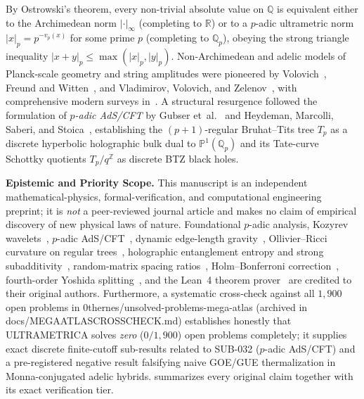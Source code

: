 \documentclass[11pt,a4paper]{article}
\numberwithin{equation}{section}
\theoremstyle{plain}
\theoremstyle{definition}
\theoremstyle{remark}
\newcommand{\Z}{\mathbb{Z}}
\newcommand{\Q}{\mathbb{Q}}
\newcommand{\R}{\mathbb{R}}
\newcommand{\Qp}{\mathbb{Q}_p}
\newcommand{\Tp}{T_p}
\newcommand{\code}[1]{{\ttfamily\footnotesize\def\_{\textunderscore\penalty0\hskip0pt}#1}}
\begin{document}
By Ostrowski's theorem, every non-trivial absolute value on $\Q$ is equivalent either to the Archimedean norm $|\cdot|_\infty$ (completing to $\R$) or to a $p$-adic ultrametric norm $|x|_p = p^{-v_p(x)}$ for some prime $p$ (completing to $\Qp$), obeying the strong triangle inequality $|x + y|_p \le \max(|x|_p, |y|_p)$. Non-Archimedean and adelic models of Planck-scale geometry and string amplitudes were pioneered by Volovich~\cite{Volovich1987}, Freund and Witten~\cite{FreundWitten1987}, and Vladimirov, Volovich, and Zelenov~\cite{Vladimirov1994}, with comprehensive modern surveys in~\cite{Dragovich2017}. A structural resurgence followed the formulation of \emph{$p$-adic AdS/CFT} by Gubser et~al.~\cite{Gubser2017,GubserEdge2017} and Heydeman, Marcolli, Saberi, and Stoica~\cite{Heydeman2018,Heydeman2021}, establishing the $(p+1)$-regular Bruhat--Tits tree $\Tp$ as a discrete hyperbolic holographic bulk dual to $\mathbb{P}^1(\Qp)$ and its Tate-curve Schottky quotients $\Tp / q^{\Z}$ as discrete BTZ black holes.

\textbf{Epistemic and Priority Scope.} This manuscript is an independent mathematical-physics, formal-verification, and computational engineering preprint; it is \emph{not} a peer-reviewed journal article and makes no claim of empirical discovery of new physical laws of nature. Foundational $p$-adic analysis, Kozyrev wavelets~\cite{Kozyrev2002}, $p$-adic AdS/CFT~\cite{Gubser2017,Heydeman2018}, dynamic edge-length gravity~\cite{GubserEdge2017}, Ollivier--Ricci curvature on regular trees~\cite{Ollivier2009,LinLuYau2011}, holographic entanglement entropy and strong subadditivity~\cite{RyuTakayanagi2006,HeadrickTakayanagi2007,Pastawski2015}, random-matrix spacing ratios~\cite{OganesyanHuse2007,Atas2013}, Holm--Bonferroni correction~\cite{Holm1979}, fourth-order Yoshida splitting~\cite{Yoshida1990}, and the Lean~4 theorem prover~\cite{deMouraUllrich2021} are credited to their original authors. Furthermore, a systematic cross-check against all $1{,}900$ open problems in \code{0thernes/unsolved-problems-mega-atlas} (archived in \code{docs/\allowbreak MEGA\_ATLAS\_CROSSCHECK.md}) establishes honestly that ULTRAMETRICA solves \emph{zero} ($0/1{,}900$) open problems completely; it supplies exact discrete finite-cutoff sub-results related to \code{SUB-032} ($p$-adic AdS/CFT) and a pre-registered negative result falsifying naive GOE/GUE thermalization in Monna-conjugated adelic hybrids.  summarizes every original claim together with its exact verification tier.
\end{document}
